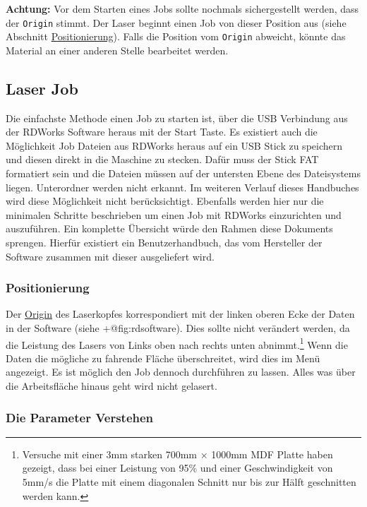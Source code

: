\documentclass[]{article}
\begin{document}
\textbf{Achtung:} Vor dem Starten eines Jobs sollte nochmals
sichergestellt werden, dass der \texttt{Origin} stimmt. Der Laser
beginnt einen Job von dieser Position aus (siehe Abschnitt
\protect\hyperlink{positionierung}{Positionierung}). Falls die Position
vom \texttt{Origin} abweicht, könnte das Material an einer anderen
Stelle bearbeitet werden.

\hypertarget{laser-job}{%
\subsection{Laser Job}\label{laser-job}}

Die einfachste Methode einen Job zu starten ist, über die USB Verbindung
aus der RDWorks Software heraus mit der Start Taste. Es existiert auch
die Möglichkeit Job Dateien aus RDWorks heraus auf ein USB Stick zu
speichern und diesen direkt in die Maschine zu stecken. Dafür muss der
Stick FAT formatiert sein und die Dateien müssen auf der untersten Ebene
des Dateisystems liegen. Unterordner werden nicht erkannt. Im weiteren
Verlauf dieses Handbuches wird diese Möglichkeit nicht berücksichtigt.
Ebenfalls werden hier nur die minimalen Schritte beschrieben um einen
Job mit RDWorks einzurichten und auszuführen. Ein komplette Übersicht
würde den Rahmen diese Dokuments sprengen. Hierfür existiert ein
Benutzerhandbuch, das vom Hersteller der Software zusammen mit dieser
ausgeliefert wird.

\hypertarget{positionierung}{%
\subsubsection{Positionierung}\label{positionierung}}

Der \protect\hyperlink{null-null-origin}{Origin} des Laserkopfes
korrespondiert mit der linken oberen Ecke der Daten in der Software
(siehe +@fig:rdsoftware). Dies sollte nicht verändert werden, da die
Leistung des Lasers von Links oben nach rechts unten abnimmt.\footnote{Versuche
  mit einer 3mm starken 700mm × 1000mm MDF Platte haben gezeigt, dass
  bei einer Leistung von 95\% und einer Geschwindigkeit von 5mm/s die
  Platte mit einem diagonalen Schnitt nur bis zur Hälft geschnitten
  werden kann.} Wenn die Daten die mögliche zu fahrende Fläche
überschreitet, wird dies im Menü angezeigt. Es ist möglich den Job
dennoch durchführen zu lassen. Alles was über die Arbeitsfläche hinaus
geht wird nicht gelasert.

\hypertarget{die-parameter-verstehen}{%
\subsubsection{Die Parameter Verstehen}\label{die-parameter-verstehen}}
\end{document}
